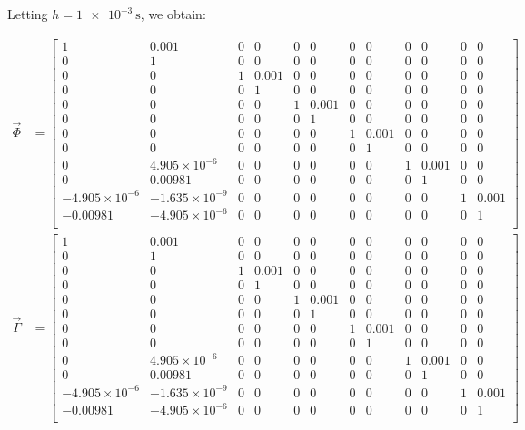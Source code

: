 Letting $h = \SI{1e-3}{\second}$, we obtain:

\begin{equation}
\begin{split}
	\vec{\Phi} &= 
	\begin{bmatrix}
		1 & 0.001 & 0 & 0 & 0 & 0 & 0 & 0 & 0 & 0 & 0 & 0 \\
		0 & 1 & 0 & 0 & 0 & 0 & 0 & 0 & 0 & 0 & 0 & 0 \\
		0 & 0 & 1 & 0.001 & 0 & 0 & 0 & 0 & 0 & 0 & 0 & 0 \\
		0 & 0 & 0 & 1 & 0 & 0 & 0 & 0 & 0 & 0 & 0 & 0 \\
		0 & 0 & 0 & 0 & 1 & 0.001 & 0 & 0 & 0 & 0 & 0 & 0 \\
		0 & 0 & 0 & 0 & 0 & 1 & 0 & 0 & 0 & 0 & 0 & 0 \\
		0 & 0 & 0 & 0 & 0 & 0 & 1 & 0.001 & 0 & 0 & 0 & 0 \\
		0 & 0 & 0 & 0 & 0 & 0 & 0 & 1 & 0 & 0 & 0 & 0 \\
		0 & 4.905\times10^{-6} & 0 & 0 & 0 & 0 & 0 & 0 & 1 & 0.001 & 0 & 0
		\\
		0 & 0.00981 & 0 & 0 & 0 & 0 & 0 & 0 & 0 & 1 & 0 & 0 \\
		-4.905\times10^{-6} & -1.635\times10^{-9} & 0
		& 0 & 0 & 0 & 0 & 0 & 0 & 0 & 1 & 0.001 \\
		-0.00981 & -4.905\times10^{-6} & 0 & 0 & 0 & 0 & 0 & 0 & 0 & 0 & 0
		& 1 \\
	\end{bmatrix} \\
	\vec{\Gamma} &= 
	\begin{bmatrix}
		1 & 0.001 & 0 & 0 & 0 & 0 & 0 & 0 & 0 & 0 & 0 & 0 \\
		0 & 1 & 0 & 0 & 0 & 0 & 0 & 0 & 0 & 0 & 0 & 0 \\
		0 & 0 & 1 & 0.001 & 0 & 0 & 0 & 0 & 0 & 0 & 0 & 0 \\
		0 & 0 & 0 & 1 & 0 & 0 & 0 & 0 & 0 & 0 & 0 & 0 \\
		0 & 0 & 0 & 0 & 1 & 0.001 & 0 & 0 & 0 & 0 & 0 & 0 \\
		0 & 0 & 0 & 0 & 0 & 1 & 0 & 0 & 0 & 0 & 0 & 0 \\
		0 & 0 & 0 & 0 & 0 & 0 & 1 & 0.001 & 0 & 0 & 0 & 0 \\
		0 & 0 & 0 & 0 & 0 & 0 & 0 & 1 & 0 & 0 & 0 & 0 \\
		0 & 4.905\times10^{-6} & 0 & 0 & 0 & 0 & 0 & 0 & 1 & 0.001 & 0 & 0
		\\
		0 & 0.00981 & 0 & 0 & 0 & 0 & 0 & 0 & 0 & 1 & 0 & 0 \\
		-4.905\times10^{-6} & -1.635\times10^{-9} & 0
		& 0 & 0 & 0 & 0 & 0 & 0 & 0 & 1 & 0.001 \\
		-0.00981 & -4.905\times10^{-6} & 0 & 0 & 0 & 0 & 0 & 0 & 0 & 0 & 0
		& 1 \\
	\end{bmatrix} 
\end{split}
\end{equation}

